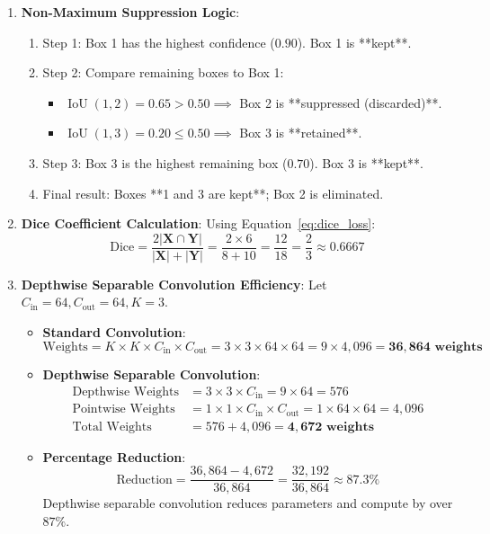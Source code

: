 \begin{enumerate}
    \item \textbf{Non-Maximum Suppression Logic}:
    \begin{enumerate}
        \item Step 1: Box 1 has the highest confidence ($0.90$). Box 1 is **kept**.
        \item Step 2: Compare remaining boxes to Box 1:
        \begin{itemize}
            \item $\operatorname{IoU}(1, 2) = 0.65 > 0.50 \implies$ Box 2 is **suppressed (discarded)**.
            \item $\operatorname{IoU}(1, 3) = 0.20 \le 0.50 \implies$ Box 3 is **retained**.
        \end{itemize}
        \item Step 3: Box 3 is the highest remaining box ($0.70$). Box 3 is **kept**.
        \item Final result: Boxes **1 and 3 are kept**; Box 2 is eliminated.
    \end{enumerate}

    \item \textbf{Dice Coefficient Calculation}:
    Using Equation~\eqref{eq:dice_loss}:
    \begin{equation*}
    \text{Dice} = \frac{2 |\mathbf{X} \cap \mathbf{Y}|}{|\mathbf{X}| + |\mathbf{Y}|} = \frac{2 \times 6}{8 + 10} = \frac{12}{18} = \frac{2}{3} \approx \mathbf{0.6667}
    \end{equation*}

    \item \textbf{Depthwise Separable Convolution Efficiency}:
    Let $C_{\text{in}} = 64, C_{\text{out}} = 64, K = 3$.
    \begin{itemize}
        \item \textbf{Standard Convolution}:
        \begin{equation*}
        \text{Weights} = K \times K \times C_{\text{in}} \times C_{\text{out}} = 3 \times 3 \times 64 \times 64 = 9 \times 4{,}096 = \mathbf{36{,}864 \text{ weights}}
        \end{equation*}
        \item \textbf{Depthwise Separable Convolution}:
        \begin{align*}
        \text{Depthwise Weights} &= 3 \times 3 \times C_{\text{in}} = 9 \times 64 = 576 \\
        \text{Pointwise Weights} &= 1 \times 1 \times C_{\text{in}} \times C_{\text{out}} = 1 \times 64 \times 64 = 4{,}096 \\
        \text{Total Weights} &= 576 + 4{,}096 = \mathbf{4{,}672 \text{ weights}}
        \end{align*}
        \item \textbf{Percentage Reduction}:
        \begin{equation*}
        \text{Reduction} = \frac{36{,}864 - 4{,}672}{36{,}864} = \frac{32{,}192}{36{,}864} \approx \mathbf{87.3\%}
        \end{equation*}
        Depthwise separable convolution reduces parameters and compute by over $87\%$.
    \end{itemize}
\end{enumerate}
